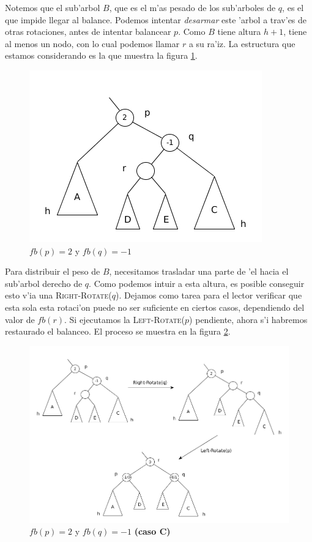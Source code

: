 Notemos que el sub'arbol $B$, que es el m'as pesado de los sub'arboles de $q$, es el que impide llegar al balance. Podemos intentar \textit{desarmar} este 'arbol a trav'es de otras rotaciones, antes de intentar balancear $p$. Como $B$ tiene altura $h + 1$, tiene al menos un nodo, con lo cual podemos llamar $r$ a su ra'iz. La estructura que estamos considerando es la que muestra la figura \ref{fig12}.

\begin{figure}[H]
	\begin{center}
		\includegraphics[scale=0.6]{imagenes/fig12.jpg}
	\end{center}
	\caption{$fb(p) = 2$ y $fb(q) = -1$}
	\label{fig12}
\end{figure}

Para distribuir el peso de $B$, necesitamos trasladar una parte de 'el hacia el sub'arbol derecho de $q$. Como podemos intuir a esta altura, es posible conseguir esto v'ia una \textsc{Right-Rotate}($q$). Dejamos como tarea para el lector verificar que esta sola esta rotaci'on puede no ser suficiente en ciertos casos, dependiendo del valor de $fb(r)$. Si ejecutamos la \textsc{Left-Rotate}($p$) pendiente, ahora s'i habremos restaurado el balanceo. El proceso se muestra en la figura \ref{fig13}.

\begin{figure}[H]
	\begin{center}
		\includegraphics[scale=0.55]{imagenes/fig13.jpg}
	\end{center}
	\caption{$fb(p) = 2$ y $fb(q) = -1$ \textbf{(caso C)}}
	\label{fig13}
\end{figure}

